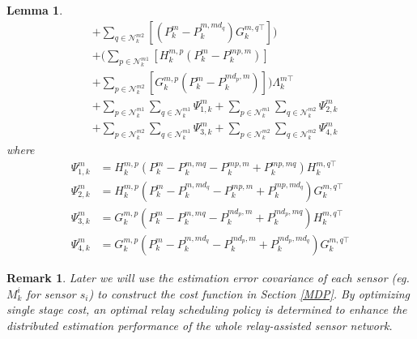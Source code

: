 \documentclass[twocolumn]{IEEEtran}
\newtheorem{lemma}{Lemma}
\newtheorem{remark}{Remark}
\begin{document}
\begin{lemma}
\begin{equation*}
\begin{split}
&+\sum_{q\in\mathcal{N}_{k}^{m2}}[(P_{k}^{m}-P_{k}^{m,md_q})G_{k}^{m,q\top}])\\
&+(\sum_{p\in\mathcal{N}_{k}^{m1}}[H_{k}^{m,p}(P_{k}^{m}-P_{k}^{mp,m})]\\
&+\sum_{p\in\mathcal{N}_{k}^{m2}}[G_{k}^{m,p}(P_{k}^{m}-P_{k}^{md_ p,m})])\Lambda_{k}^{m\top}\\
&+\sum_{p\in\mathcal{N}_{k}^{m1}}\sum_{q\in\mathcal{N}_{k}^{m1}}\Psi_{1,k}^{m}+\sum_{p\in\mathcal{N}_{k}^{m1}}\sum_{q\in\mathcal{N}_{k}^{m2}}\Psi_{2,k}^{m}\\
&+\sum_{p\in\mathcal{N}_{k}^{m2}}\sum_{q\in\mathcal{N}_{k}^{m1}}\Psi_{3,k}^{m}+\sum_{p\in\mathcal{N}_{k}^{m2}}\sum_{q\in\mathcal{N}_{k}^{m2}}\Psi_{4,k}^{m}
\end{split}
\end{equation*}
where
\begin{equation*}
\begin{split}
\Psi_{1,k}^{m}&=H_{k}^{m,p}(P_{k}^{m}-P_{k}^{m,mq}-P_{k}^{mp,m}+P_{k}^{mp,mq})H_{k}^{m,q\top}\\
\Psi_{2,k}^{m}&=H_{k}^{m,p}(P_{k}^{m}-P_{k}^{m,md_q}-P_{k}^{mp,m}+P_{k}^{mp,md_q})G_{k}^{m,q\top}\\
\Psi_{3,k}^{m}&=G_{k}^{m,p}(P_{k}^{m}-P_{k}^{m,mq}-P_{k}^{md_p,m}+P_{k}^{md_p,mq})H_{k}^{m,q\top}\\
\Psi_{4,k}^{m}&=G_{k}^{m,p}(P_{k}^{m}-P_{k}^{m,md_q}-P_{k}^{md_p,m}+P_{k}^{md_p,md_q})G_{k}^{m,q\top}
\end{split}
\end{equation*}
\end{lemma}

\begin{remark}
Later we will use the estimation error covariance of each sensor (eg. $M_{k}^{i}$ for sensor $s_{i}$) to construct the cost function in Section \ref{MDP}. By optimizing single stage cost, an optimal relay scheduling policy is determined to enhance the distributed estimation performance of the whole relay-assisted sensor network.
\end{remark}
\end{document}
